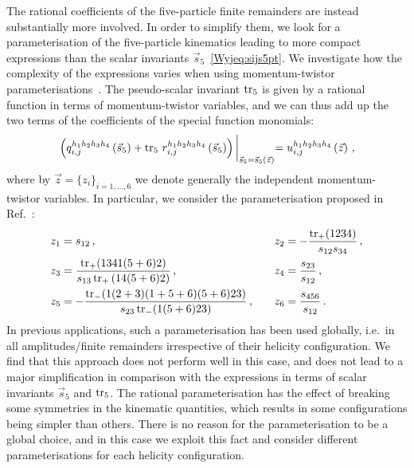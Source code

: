 \documentclass[main.tex]{subfiles}
\begin{document}
The rational coefficients of the five-particle finite remainders are instead substantially more involved. In order to simplify them, we look for a parameterisation of the five-particle kinematics leading to more compact expressions than the scalar invariants $\vec{s}_5$~\eqref{Wyjeq:sijs5pt}. We investigate how the complexity of the expressions varies when using momentum-twistor parameterisations~\cite{Hodges:2009hk}. The pseudo-scalar invariant $\operatorname{\rm tr}_5$ is given by a rational function in terms of momentum-twistor variables, and we can thus add up the two terms of the coefficients of the special function monomials:
\begin{align}
\left( q_{i,j}^{h_1h_2h_3h_4}\left(\vec{s}_5\right) + \operatorname{\rm tr}_5 \, r_{i,j}^{h_1h_2h_3h_4}\left(\vec{s}_5\right) \right) \biggl|_{\vec{s}_5 = \vec{s}_5(\vec{z})} = u_{i,j}^{h_1h_2h_3h_4}\left(\vec{z}\right) \,,
\end{align}
where by $\vec{z} = \{z_i \}_{i=1,\ldots,6}$ we denote generally the independent momentum-twistor variables. In particular, we consider the parameterisation proposed in Ref.~\cite{Badger:2021ega}:
\begin{equation}
\begin{alignedat}{2}
  & z_1 = s_{12} \,, \qquad && z_2 = -\frac{\operatorname{\rm tr}_+(1234)}{s_{12}s_{34}} \,, \\
  & z_3 = \frac{\operatorname{\rm tr}_+(1341(5+6)2)}{s_{13}\operatorname{\rm tr}_+{(14(5+6)2)}} \,, \qquad && z_4 = \frac{s_{23}}{s_{12}} \,, \\
  & z_5 = -\frac{\operatorname{\rm tr}_-(1(2+3)(1+5+6)(5+6)23)}{s_{23}\operatorname{\rm tr}_-(1(5+6)23)} \,, \qquad && z_6 = \frac{s_{456}}{s_{12}} \,.
\end{alignedat}
\label{Wyjeq:mtvardefs5pt}
\end{equation}
In previous applications, such a parameterisation has been used globally, i.e.\ in all amplitudes/finite remainders
irrespective of their helicity configuration. We find that this approach does not perform well in
this case, and does not lead to a major simplification in comparison with the expressions in terms of scalar invariants $\vec{s}_5$ and $\operatorname{\rm tr}_5$. 
The rational parameterisation has the effect of breaking some symmetries in the kinematic quantities,
which results in some configurations being simpler than others. There is no reason for the parameterisation
to be a global choice, and in this case we exploit this fact and consider different parameterisations for each helicity configuration.
\end{document}
